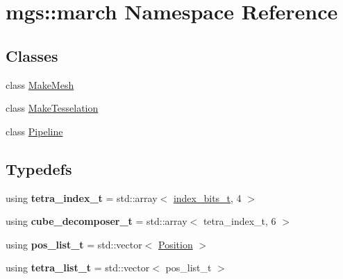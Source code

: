 \hypertarget{namespacemgs_1_1march}{}\section{mgs\+:\+:march Namespace Reference}
\label{namespacemgs_1_1march}
\subsection*{Classes}
\begin{DoxyCompactItemize}
\item 
class \hyperlink{classmgs_1_1march_1_1MakeMesh}{Make\+Mesh}
\item 
class \hyperlink{classmgs_1_1march_1_1MakeTesselation}{Make\+Tesselation}
\item 
class \hyperlink{classmgs_1_1march_1_1Pipeline}{Pipeline}
\end{DoxyCompactItemize}
\subsection*{Typedefs}
\begin{DoxyCompactItemize}
\item 
\mbox{\label{namespacemgs_1_1march_a0aad9b3e6e0397451a4c792a25c44ca1}} 
using {\bfseries tetra\+\_\+index\+\_\+t} = std\+::array$<$ \hyperlink{namespacemgs_a40c361242ea98fb1ff1241d06f7d5568}{index\+\_\+bits\+\_\+t}, 4 $>$
\item 
\mbox{\label{namespacemgs_1_1march_a81573635f8974f15f4b71b6050e8b38d}} 
using {\bfseries cube\+\_\+decomposer\+\_\+t} = std\+::array$<$ tetra\+\_\+index\+\_\+t, 6 $>$
\item 
\mbox{\label{namespacemgs_1_1march_af86a2a7e7bcb7196097eda7749bf60e0}} 
using {\bfseries pos\+\_\+list\+\_\+t} = std\+::vector$<$ \hyperlink{structmgs_1_1Vector}{Position} $>$
\item 
\mbox{\label{namespacemgs_1_1march_ad66d833e33f4513fb34382103bddf074}} 
using {\bfseries tetra\+\_\+list\+\_\+t} = std\+::vector$<$ pos\+\_\+list\+\_\+t $>$
\end{DoxyCompactItemize}
